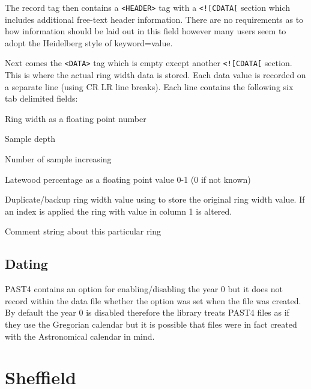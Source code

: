 The record tag then contains a \verb|<HEADER>| tag with a \verb|<![CDATA[| section which includes additional free-text header information. There are no requirements as to how information should be laid out in this field however many users seem to adopt the Heidelberg style of keyword=value.

Next comes the \verb|<DATA>| tag which is empty except another \verb|<![CDATA[| section. This is where the actual ring width data is stored. Each data value is recorded on a separate line (using CR LR line breaks). Each line contains the following six tab delimited fields:

\begin{itemize*}
    \item  Ring width as a floating point number
    \item  Sample depth
    \item  Number of sample increasing
    \item  Latewood percentage as a floating point value 0-1 (0 if not known)
    \item  Duplicate/backup ring width value using to store the original ring width value. If an index is applied the ring with value in column 1 is altered.
    \item  Comment string about this particular ring 
\end{itemize*}

\section{Dating}

PAST4 contains an option for enabling/disabling the year 0 but it does not record within the data file whether the option was set when the file was created. By default the year 0 is disabled therefore the library treats PAST4 files as if they use the Gregorian calendar but it is possible that files were in fact created with the Astronomical calendar in mind. 


\chapter{Sheffield}

